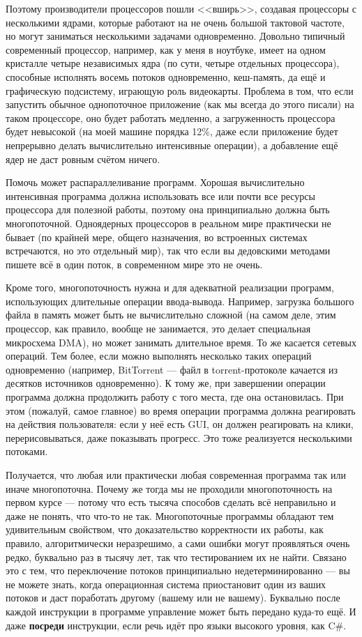 \documentclass{../../text-style}
\begin{document}
Поэтому производители процессоров пошли <<вширь>>, создавая процессоры с несколькими ядрами, которые работают на не очень большой тактовой частоте, но могут заниматься несколькими задачами одновременно. Довольно типичный современный процессор, например, как у меня в ноутбуке, имеет на одном кристалле четыре независимых ядра (по сути, четыре отдельных процессора), способные исполнять восемь потоков одновременно, кеш-память, да ещё и графическую подсистему, играющую роль видеокарты. Проблема в том, что если запустить обычное однопоточное приложение (как мы всегда до этого писали) на таком процессоре, оно будет работать медленно, а загруженность процессора будет невысокой (на моей машине порядка 12\%, даже если приложение будет непрерывно делать вычислительно интенсивные операции), а добавление ещё ядер не даст ровным счётом ничего.

Помочь может распараллеливание программ. Хорошая вычислительно интенсивная программа должна использовать все или почти все ресурсы процессора для полезной работы, поэтому она принципиально должна быть многопоточной. Одноядерных процессоров в реальном мире практически не бывает (по крайней мере, общего назначения, во встроенных системах встречаются, но это отдельный мир), так что если вы дедовскими методами пишете всё в один поток, в современном мире это не очень.

Кроме того, многопоточность нужна и для адекватной реализации программ, использующих длительные операции ввода-вывода. Например, загрузка большого файла в память может быть не вычислительно сложной (на самом деле, этим процессор, как правило, вообще не занимается, это делает специальная микросхема DMA), но может занимать длительное время. То же касается сетевых операций. Тем более, если можно выполнять несколько таких операций одновременно (например, BitTorrent --- файл в torrent-протоколе качается из десятков источников одновременно). К тому же, при завершении операции программа должна продолжить работу с того места, где она остановилась. При этом (пожалуй, самое главное) во время операции программа должна реагировать на действия пользователя: если у неё есть GUI, он должен реагировать на клики, перерисовываться, даже показывать прогресс. Это тоже реализуется несколькими потоками.

Получается, что любая или практически любая современная программа так или иначе многопоточна. Почему же тогда мы не проходили многопоточность на первом курсе --- потому что есть тысяча способов сделать всё неправильно и даже не понять, что что-то не так. Многопоточные программы обладают тем удивительным свойством, что доказательство корректности их работы, как правило, алгоритмически неразрешимо, а сами ошибки могут проявляться очень редко, буквально раз в тысячу лет, так что тестированием их не найти. Связано это с тем, что переключение потоков принципиально недетерминированно --- вы не можете знать, когда операционная система приостановит один из ваших потоков и даст поработать другому (вашему или не вашему). Буквально после каждой инструкции в программе управление может быть передано куда-то ещё. И даже \textbf{посреди} инструкции, если речь идёт про языки высокого уровня, как C\#.
\end{document}
